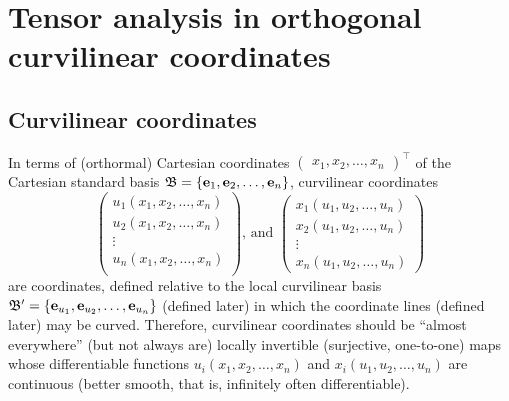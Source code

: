 

\section{Tensor analysis in orthogonal curvilinear coordinates}

\subsection{Curvilinear coordinates}
In terms of (orthormal) Cartesian coordinates $\begin{pmatrix}x_1, x_2,\ldots , x_n\end{pmatrix}^\intercal$
of the Cartesian standard basis ${\frak B}=\left\{ {\bf e}_1, {\bf e}_2,\ldots ,{\bf e}_n \right\}$,
curvilinear coordinates
\begin{equation}
\begin{pmatrix}  u_1(x_1, x_2,\ldots ,x_n)\\
 u_2(x_1, x_2,\ldots ,x_n)\\
\vdots \\
 u_n(x_1, x_2,\ldots ,x_n)\\
\end{pmatrix}
\text{, and }
\begin{pmatrix}
x_1(u_1, u_2,\ldots ,u_n)\\
x_2(u_1, u_2,\ldots ,u_n)\\
\vdots \\
 x_n(u_1, u_2,\ldots ,u_n)
\end{pmatrix}
\label{2018-mm-ch-ten-cc}
\end{equation}
are coordinates, defined relative to the local curvilinear basis
${\frak B}'=\left\{ {\bf e}_{u_1}, {\bf e}_{u_2},\ldots ,{\bf e}_{u_n} \right\}$
(defined later)
in which the coordinate lines (defined later) may be curved.
Therefore, curvilinear coordinates should be ``almost everywhere'' (but not always are)
locally invertible (surjective, one-to-one) maps whose differentiable functions
$u_i(x_1, x_2,\ldots ,x_n)$ and $x_i(u_1, u_2,\ldots ,u_n)$
are continuous (better smooth, that is, infinitely often differentiable).
